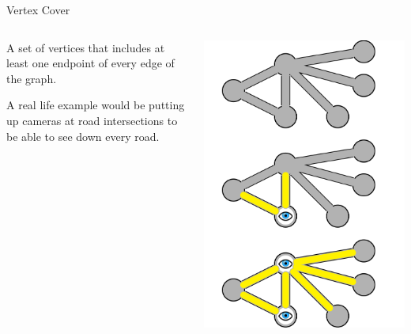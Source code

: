 \documentclass{beamer}
\begin{document}
\begin{frame}{Vertex Cover}
    \begin{columns}
        \begin{column}{0.6\textwidth}
            A set of vertices that includes at least one endpoint of every edge of the graph.

            \hfill

            A real life example would be putting up cameras at road intersections to be able to see down every road.
        \end{column}
        \begin{column}{0.3\textwidth}
            \begin{center}
                \includegraphics[width=\textwidth]{vertex-cover}
            \end{center}
        \end{column}
    \end{columns}
\end{frame}
\end{document}
